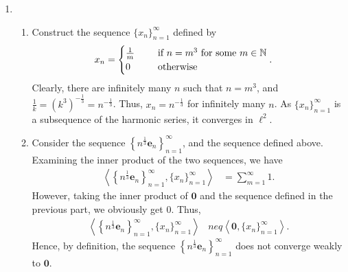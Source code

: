 \documentclass[a4paper,11pt]{article}
\newcommand{\ds}{\displaystyle}
\begin{document}
{{\begin{enumerate}[leftmargin=*]
\begin{enumerate}[label=\roman*)]
\begin{enumerate}[label =\alph*)]
					\item Define $\ds{h(x) = \begin{cases} x & x \leq 1 \\ x+1 \hspace{5mm} & x > 1 \\ \end{cases}}$. Consider the exhaustive cases for the pre-image of $\ds{(a,b] \in \tau}$:
						\bigbreak
						\textbf{Case 1:} $\ds{1 < a < b \implies h^{-1}((a,b]) = \left(\max\{a-1,1\},\max\{b-1,1\}\right] \in \tau}$. 
						\bigbreak
						\textbf{Case 2:} $\ds{ a < b \leq 2 \implies h^{-1}((a,b]) = \left(\min\{a,1\},\min\{b,1\}\right] \in \tau}$. 
						\bigbreak
						\textbf{Case 3:} $\ds{a \leq 1 \text{ and } b > 2 \implies h^{-1}((a,b]) = (a,b-1] \in \tau}$.
						\bigbreak
						Therefore $\ds{h(x)}$ is continuous on $\ds{\tau}$.

				\end{enumerate}
		\end{enumerate}
		\item
		\begin{enumerate}[label=\roman*)]
			\item Construct the sequence $\ds{\{x_n\}_{n=1}^{\infty}}$ defined by
				\begin{align*}
					x_n & = 
					\begin{cases}
						\frac{1}{m} \hspace{5mm} & \text{if } n = m^3 \text{ for some } m \in \mathbb{N} \\
						0 & \text{otherwise}
					\end{cases}.
				\end{align*}
				Clearly, there are infinitely many $\ds{n}$ such that $\ds{n = m^3}$, and $\ds{\tfrac{1}{k} = \left(k^3\right)^{-\tfrac{1}{3}} = n^{-\tfrac{1}{3}}}$. Thus, $\ds{x_n = n^{-\tfrac{1}{3}}}$ for infinitely many $\ds{n}$. As $\ds{\{x_n\}_{n=1}^{\infty}}$ is a subsequence of the harmonic series, it converges in $\ds{\ell^2}$.

			\item Consider the sequence $\ds{\left\{n^{\frac{1}{3}}\mathbf{e}_n\right\}_{n=1}^{\infty}}$, and the sequence defined above. Examining the inner product of the two sequences, we have
				\begin{align*}
					\left\langle \left\{n^{\frac{1}{3}}\mathbf{e}_n\right\}_{n=1}^{\infty}, \{x_n\}_{n=1}^{\infty} \right\rangle & = \sum_{m=1}^{\infty} 1.
				\end{align*}
				However, taking the inner product of $\ds{\mathbf{0}}$ and the sequence defined in the previous part, we obviously get $\ds{0}$. Thus, 
				\begin{align*}
					\left\langle \left\{n^{\frac{1}{3}}\mathbf{e}_n\right\}_{n=1}^{\infty}, \{x_n\}_{n=1}^{\infty} \right\rangle & neq \left\langle \mathbf{0}, \{x_n\}_{n=1}^{\infty} \right\rangle. 
				\end{align*}
				Hence, by definition, the sequence $\ds{\left\{n^{\frac{1}{3}}\mathbf{e}_n\right\}_{n=1}^{\infty}}$ does not converge weakly to $\ds{\mathbf{0}}$.


\end{enumerate}
\end{enumerate}}}
\end{document}
